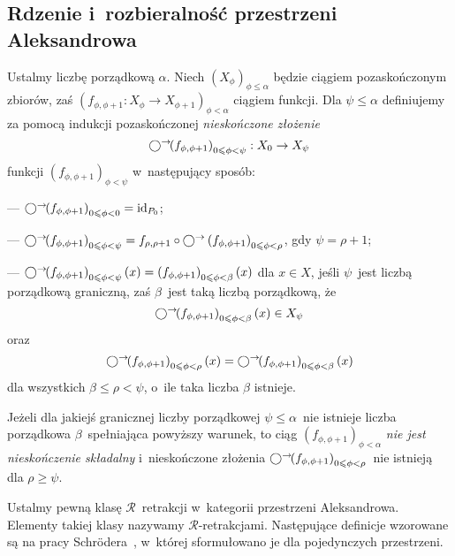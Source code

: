 \subsection{Rdzenie i~rozbieralność przestrzeni Aleksandrowa}\label{subsec-rdzenie_i_rozb_p_Al}
Ustalmy liczbę porządkową $\alpha$. Niech $\left(X_\phi\right)_{\phi\leq\alpha}$ będzie ciągiem pozaskończonym zbiorów, zaś $\left(f_{\phi,\phi+1}\colon X_{\phi}\to X_{\phi+1}\right)_{\phi<\alpha}$ ciągiem funkcji. Dla $\psi\leq\alpha$ definiujemy za pomocą indukcji pozaskończonej \textit{nieskończone złożenie} \[\bigcirc^\rightarrow\!\!\left(f_{\phi,\phi+1}\right)_{0\leqslant\phi<\psi}:X_0\to X_\psi\] funkcji $\left(f_{\phi,\phi+1}\right)_{\phi<\psi}$ w~następujący sposób:
\begin{compactitem}
\item[---] $\bigcirc^\rightarrow\!\!\left(f_{\phi,\phi+1}\right)_{0\leqslant\phi<0}=\operatorname{id}_{P_0}$;
\item[---] $\bigcirc^\rightarrow\!\!\left(f_{\phi,\phi+1}\right)_{0\leqslant\phi<\psi}=f_{\rho,\rho+1}\circ \bigcirc^\rightarrow\left(f_{\phi,\phi+1}\right)_{0\leqslant\phi<\rho}$, gdy $\psi=\rho+1$;
\item[---] $\bigcirc^\rightarrow\!\!\left(f_{\phi,\phi+1}\right)_{0\leqslant\phi<\psi}(x)=\left(f_{\phi,\phi+1}\right)_{0\leqslant\phi<\beta}(x)$ dla $x\in X$, jeśli $\psi$~jest liczbą porządkową graniczną, zaś $\beta$~jest taką liczbą porządkową, że \[\bigcirc^\rightarrow\!\!\left(f_{\phi,\phi+1}\right)_{0\leqslant\phi<\beta}(x)\in X_\psi\] oraz \[\bigcirc^\rightarrow\!\!\left(f_{\phi,\phi+1}\right)_{0\leqslant\phi<\rho}(x)=\bigcirc^\rightarrow\!\!\left(f_{\phi,\phi+1}\right)_{0\leqslant\phi<\beta}(x)\] dla wszystkich $\beta\leq \rho<\psi$, o~ile taka liczba $\beta$ istnieje. 
\end{compactitem}
Jeżeli dla jakiejś granicznej liczby porządkowej $\psi\leq \alpha$~nie istnieje liczba porządkowa $\beta$~spełniająca powyższy warunek, to ciąg $\left(f_{\phi,\phi+1}\right)_{\phi<\alpha}$ \textit{nie jest nieskończenie składalny} i~nieskończone złożenia $\bigcirc^\rightarrow\!\!\left(f_{\phi,\phi+1}\right)_{0\leqslant\phi<\rho}$~nie istnieją dla $\rho\geq\psi$.

Ustalmy pewną klasę $\mathcal{R}$~retrakcji w~kategorii przestrzeni Aleksandrowa. Elementy takiej klasy nazywamy $\mathcal{R}$-retrakcjami. Następujące definicje wzorowane są na pracy Schr{\"o}dera~\cite{Schroder99}, w~której sformułowano je dla pojedynczych przestrzeni.

